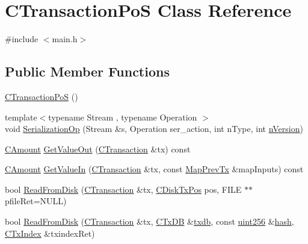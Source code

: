 \hypertarget{class_c_transaction_po_s}{}\section{C\+Transaction\+Po\+S Class Reference}
\label{class_c_transaction_po_s}


{\ttfamily \#include $<$main.\+h$>$}

\subsection*{Public Member Functions}
\begin{DoxyCompactItemize}
\item 
\hyperlink{class_c_transaction_po_s_a62c7444fc534ca35869017157ed508f0}{C\+Transaction\+Po\+S} ()
\item 
{\footnotesize template$<$typename Stream , typename Operation $>$ }\\void \hyperlink{class_c_transaction_po_s_a869ab87a63c21805ddff3cdec279817f}{Serialization\+Op} (Stream \&s, Operation ser\+\_\+action, int n\+Type, int \hyperlink{class_c_transaction_po_s_ae7bcf394bd58ec57e762934da2f13d52}{n\+Version})
\item 
\hyperlink{amount_8h_a4eaf3a5239714d8c45b851527f7cb564}{C\+Amount} \hyperlink{class_c_transaction_po_s_ad85303c69a61f41eb8874f07c15faa10}{Get\+Value\+Out} (\hyperlink{class_c_transaction}{C\+Transaction} \&tx) const 
\item 
\hyperlink{amount_8h_a4eaf3a5239714d8c45b851527f7cb564}{C\+Amount} \hyperlink{class_c_transaction_po_s_ac2c734d9f302dda6e8681ce6d0f7843e}{Get\+Value\+In} (\hyperlink{class_c_transaction}{C\+Transaction} \&tx, const \hyperlink{main_8h_a05bae354566c88f7dca5ad13aaf8b30f}{Map\+Prev\+Tx} \&map\+Inputs) const 
\item 
bool \hyperlink{class_c_transaction_po_s_a7c71229336405cae52bd3e9a547f1266}{Read\+From\+Disk} (\hyperlink{class_c_transaction}{C\+Transaction} \&tx, \hyperlink{class_c_disk_tx_pos}{C\+Disk\+Tx\+Pos} pos, F\+I\+L\+E $\ast$$\ast$pfile\+Ret=N\+U\+L\+L)
\item 
bool \hyperlink{class_c_transaction_po_s_a12c8edc9dfa71e3ac64647624731a8bb}{Read\+From\+Disk} (\hyperlink{class_c_transaction}{C\+Transaction} \&tx, \hyperlink{class_c_tx_d_b}{C\+Tx\+D\+B} \&\hyperlink{txdb-leveldb_8cpp_a72eff8ae1d84de13daf97a61b8c02bc6}{txdb}, const \hyperlink{classuint256}{uint256} \&\hyperlink{cache_8cc_a11ecb029164e055f28f4123ce3748862}{hash}, \hyperlink{class_c_tx_index}{C\+Tx\+Index} \&txindex\+Ret)
$$
\end{DoxyCompactItemize}
